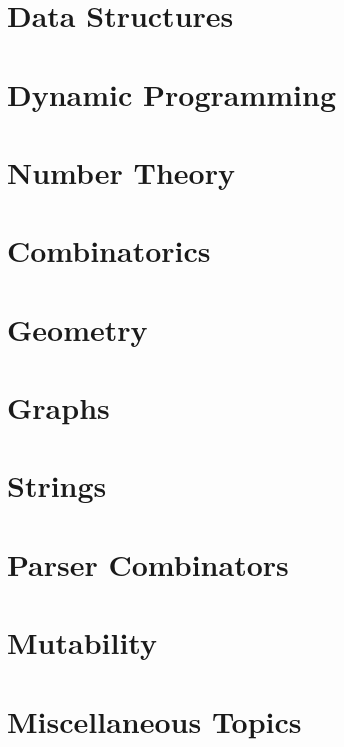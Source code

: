\documentclass{book}
\begin{document}
\chapter{Data Structures}
\label{chap:data-structures}

\chapter{Dynamic Programming}
\label{chap:dp}

\chapter{Number Theory}
\label{chap:number-theory}

\chapter{Combinatorics}
\label{chap:combinatorics}

\chapter{Geometry}
\label{chap:geometry}

\chapter{Graphs}
\label{chap:graphs}

\chapter{Strings}
\label{chap:strings}

\chapter{Parser Combinators}
\label{chap:parser-comb}

\chapter{Mutability}
\label{chap:mutability}

\chapter{Miscellaneous Topics}
\label{chap:misc}

\printbibliography
\end{document}
